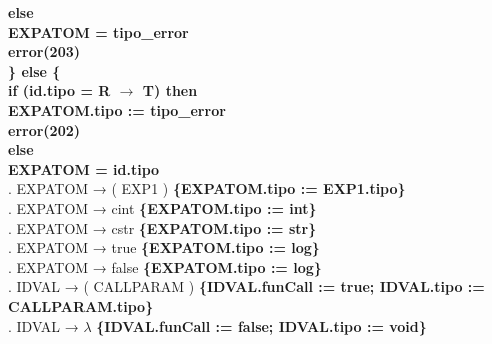\begin{tabbing}
    \>              \>          \> \textbf{else}\\
    \>              \>          \>      \> \textbf{EXPATOM = tipo\_error}\\
    \>              \>          \>      \> \textbf{error(203)}\\
    \>              \> \textbf{\} else \{}\\
    \>              \>          \> \textbf{if (id.tipo = R $\rightarrow$ T) then}\\
    \>              \>          \>      \> \textbf{EXPATOM.tipo := tipo\_error}\\
    \>              \>          \>      \> \textbf{error(202)}\\
    \>              \>          \> \textbf{else}\\
    \>              \>          \>      \> \textbf{EXPATOM = id.tipo}\\
    . EXPATOM → ( EXP1 ) \textbf{\{EXPATOM.tipo := EXP1.tipo\}}\\
    . EXPATOM → cint \textbf{\{EXPATOM.tipo := int\}}\\
    . EXPATOM → cstr \textbf{\{EXPATOM.tipo := str\}}\\
    . EXPATOM → true \textbf{\{EXPATOM.tipo := log\}}\\
    . EXPATOM → false \textbf{\{EXPATOM.tipo := log\}}\\
    . IDVAL → ( CALLPARAM ) \textbf{\{IDVAL.funCall := true; IDVAL.tipo := CALLPARAM.tipo\}}\\
    . IDVAL → $\lambda$ \textbf{\{IDVAL.funCall := false; IDVAL.tipo := void\}}\\
\end{tabbing}
